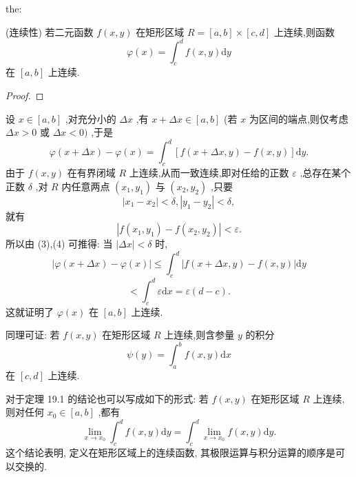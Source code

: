 \begin{theorem}{}{the:}

\end{theorem}
 (连续性) 若二元函数 \(f\left( {x,y}\right)\) 在矩形区域 \(R = \left\lbrack  {a,b}\right\rbrack   \times  \left\lbrack  {c,d}\right\rbrack\) 上连续,则函数
\[
\varphi \left( x\right)  = {\int }_{c}^{d}f\left( {x,y}\right) \mathrm{d}y
\]
在 \(\left\lbrack  {a,b}\right\rbrack\) 上连续.

\begin{proof}

\end{proof}
设 \(x \in  \left\lbrack  {a,b}\right\rbrack\) ,对充分小的 \({\Delta x}\) ,有 \(x + {\Delta x} \in  \left\lbrack  {a,b}\right\rbrack\) (若 \(x\) 为区间的端点,则仅考虑 \({\Delta x} > 0\) 或 \({\Delta x} < 0)\) ,于是
\[
\varphi \left( {x + {\Delta x}}\right)  - \varphi \left( x\right)  = {\int }_{c}^{d}\left\lbrack  {f\left( {x + {\Delta x},y}\right)  - f\left( {x,y}\right) }\right\rbrack  \mathrm{d}y. \tag{3}
\]
由于 \(f\left( {x,y}\right)\) 在有界闭域 \(R\) 上连续,从而一致连续,即对任给的正数 \(\varepsilon\) ,总存在某个正数 \(\delta\) ,对 \(R\) 内任意两点 \(\left( {{x}_{1},{y}_{1}}\right)\) 与 \(\left( {{x}_{2},{y}_{2}}\right)\) ,只要
\[
\left| {{x}_{1} - {x}_{2}}\right|  < \delta ,\left| {{y}_{1} - {y}_{2}}\right|  < \delta ,
\]
就有
\[
\left| {f\left( {{x}_{1},{y}_{1}}\right)  - f\left( {{x}_{2},{y}_{2}}\right) }\right|  < \varepsilon . \tag{4}
\]
所以由 (3),(4) 可推得: 当 \(\left| {\Delta x}\right|  < \delta\) 时,
\[
\left| {\varphi \left( {x + {\Delta x}}\right)  - \varphi \left( x\right) }\right|  \leq  {\int }_{c}^{d}\left| {f\left( {x + {\Delta x},y}\right)  - f\left( {x,y}\right) }\right| \mathrm{d}y
\]
\[
< {\int }_{c}^{d}\varepsilon \mathrm{d}x = \varepsilon \left( {d - c}\right) .
\]
这就证明了 \(\varphi \left( x\right)\) 在 \(\left\lbrack  {a,b}\right\rbrack\) 上连续.

同理可证: 若 \(f\left( {x,y}\right)\) 在矩形区域 \(R\) 上连续,则含参量 \(y\) 的积分
\[
\psi \left( y\right)  = {\int }_{a}^{b}f\left( {x,y}\right) \mathrm{d}x \tag{5}
\]
在 \(\left\lbrack  {c,d}\right\rbrack\) 上连续.

对于定理 19.1 的结论也可以写成如下的形式: 若 \(f\left( {x,y}\right)\) 在矩形区域 \(R\) 上连续,则对任何 \({x}_{0} \in  \left\lbrack  {a,b}\right\rbrack\) ,都有
\[
\mathop{\lim }\limits_{{x \rightarrow  {x}_{0}}}{\int }_{c}^{d}f\left( {x,y}\right) \mathrm{d}y = {\int }_{c}^{d}\mathop{\lim }\limits_{{x \rightarrow  {x}_{0}}}f\left( {x,y}\right) \mathrm{d}y.
\]
这个结论表明, 定义在矩形区域上的连续函数, 其极限运算与积分运算的顺序是可以交换的.

